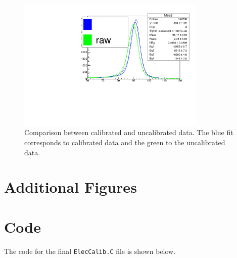 \documentclass[a4paper]{report}
\numberwithin{equation}{section}
\begin{document}
\begin{figure}[htpb]
    \centering
    \includegraphics[width=0.8\textwidth]{calib_compare}
    \caption{Comparison between calibrated and uncalibrated data. The blue fit corresponds to calibrated data and the green to the uncalibrated data.}
    \label{fig:calib-compare}
\end{figure}

\printbibliography

\appendix

\chapter{Additional Figures} \label{chap:appendix_figs}


\chapter{Code} \label{chap:appendix_code}

The code for the final \texttt{ElecCalib.C} file is shown below. 
\end{document}
